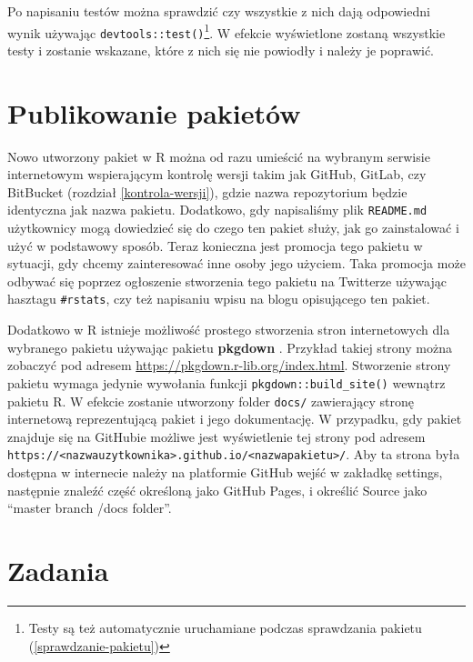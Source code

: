 \documentclass[paper=6in:9in,pagesize=pdftex,headinclude=on,footinclude=on,10pt]{scrbook}
\begin{document}
Po napisaniu testów można sprawdzić czy wszystkie z nich dają odpowiedni wynik używając \texttt{devtools::test()}\footnote{Testy są też automatycznie uruchamiane podczas sprawdzania pakietu (\ref{sprawdzanie-pakietu})}.
W efekcie wyświetlone zostaną wszystkie testy i zostanie wskazane, które z nich się nie powiodły i należy je poprawić.

\hypertarget{publikowanie-pakietow}{%
\section{Publikowanie pakietów}\label{publikowanie-pakietow}}

Nowo utworzony pakiet w R można od razu umieścić na wybranym serwisie internetowym wspierającym kontrolę wersji takim jak GitHub, GitLab, czy BitBucket (rozdział \ref{kontrola-wersji}), gdzie nazwa repozytorium będzie identyczna jak nazwa pakietu.
Dodatkowo, gdy napisaliśmy plik \texttt{README.md} użytkownicy mogą dowiedzieć się do czego ten pakiet służy, jak go zainstalować i użyć w podstawowy sposób.
Teraz konieczna jest promocja tego pakietu w sytuacji, gdy chcemy zainteresować inne osoby jego użyciem.
Taka promocja może odbywać się poprzez ogłoszenie stworzenia tego pakietu na Twitterze używając hasztagu \texttt{\#rstats}, czy też napisaniu wpisu na blogu opisującego ten pakiet.

Dodatkowo w R istnieje możliwość prostego stworzenia stron internetowych dla wybranego pakietu używając pakietu \textbf{pkgdown} \citep{R-pkgdown}.
Przykład takiej strony można zobaczyć pod adresem \url{https://pkgdown.r-lib.org/index.html}.
Stworzenie strony pakietu wymaga jedynie wywołania funkcji \texttt{pkgdown::build\_site()} wewnątrz pakietu R.
W efekcie zostanie utworzony folder \texttt{docs/} zawierający stronę internetową reprezentującą pakiet i jego dokumentację.
W przypadku, gdy pakiet znajduje się na GitHubie możliwe jest wyświetlenie tej strony pod adresem \texttt{https://\textless{}nazwauzytkownika\textgreater{}.github.io/\textless{}nazwapakietu\textgreater{}/}.
Aby ta strona była dostępna w internecie należy na platformie GitHub wejść w zakładkę settings, następnie znaleźć część określoną jako GitHub Pages, i określić Source jako ``master branch /docs folder''.

\hypertarget{zadania-12}{%
\section{Zadania}\label{zadania-12}}
\end{document}

